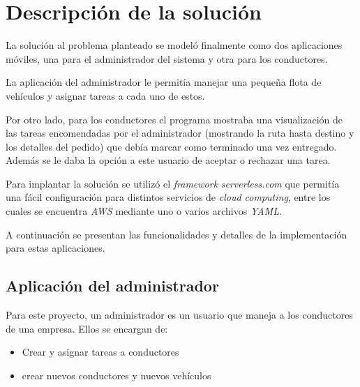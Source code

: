 \section{Descripción de la solución}
  La solución al problema planteado se modeló finalmente como dos aplicaciones móviles, 
  una para el administrador del sistema y otra para los conductores.

  La aplicación del administrador le permitía manejar una pequeña flota de vehículos y 
  asignar tareas a cada uno de estos.

  Por otro lado, para los conductores el programa mostraba una visualización de las 
  tareas encomendadas por el administrador (mostrando la ruta hasta destino y los 
  detalles del pedido) que debía marcar como terminado una vez entregado. 
  Además se le daba la opción a este usuario de aceptar o rechazar una tarea.

  Para implantar la solución se utilizó el \textit{framework} \textit{serverless.com} que
  permitía una fácil configuración para distintos servicios de \textit{cloud computing}, 
  entre los cuales se encuentra \textit{AWS} mediante uno o varios archivos \textit{YAML}.

  A continuación se presentan las funcionalidades y detalles de la implementación para 
  estas aplicaciones.

  \subsection{Aplicación del administrador}
    Para este proyecto, un administrador es un usuario que maneja a los conductores de 
    una empresa.
    Ellos se encargan de: 
    \begin{itemize}
      \item Crear y asignar tareas a conductores
      \item crear nuevos conductores y nuevos vehículos
    \end{itemize}

